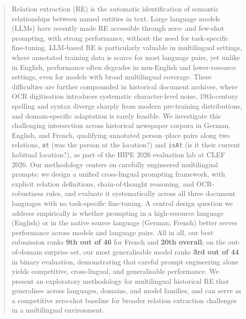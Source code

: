 \documentclass[
]{ceurart}
\theoremstyle{definition}
\begin{document}
\begin{abstract}
Relation extraction (RE) is the automatic identification of semantic relationships between named entities in text. Large language models (LLMs) have recently made RE accessible through zero- and few-shot prompting, with strong performance, without the need for task-specific fine-tuning.
LLM-based RE is particularly valuable in multilingual settings, where annotated training data is scarce for most language pairs, yet unlike in English, performance often degrades in non-English and lower-resource settings, even for models with broad multilingual coverage.
These difficulties are further compounded in historical document archives, where OCR digitisation introduces systematic character-level noise, 19th-century spelling and syntax diverge sharply from modern pre-training distributions, and domain-specific adaptation is rarely feasible.
We investigate this challenging intersection across historical newspaper corpora in German, English, and French, qualifying annotated person--place pairs along two relations, \texttt{at} (was the person at the location?) and \texttt{isAt} (is it their current habitual location?), as part of the HIPE 2026 evaluation lab at CLEF 2026.
Our methodology centers on carefully engineered multilingual prompts: we design a unified cross-lingual prompting framework, with explicit relation definitions, chain-of-thought reasoning, and OCR-robustness rules, and evaluate it systematically across all three document languages with no task-specific fine-tuning. A central design question we address empirically is whether prompting in a high-resource language (English) or in the native source language (German, French) better serves performance across models and language pairs.
All in all, our best submission ranks \textbf{9th out of 46} for French and \textbf{20th overall}; on the out-of-domain surprise set, our most generalisable model ranks \textbf{3rd out of 44} in binary evaluation, demonstrating that careful prompt engineering alone yields competitive, cross-lingual, and generalisable performance.
We present an exploratory methodology for multilingual historical RE that generalises across languages, domains, and model families, and can serve as a competitive zero-shot baseline for broader relation extraction challenges in a multilingual environment.
\end{abstract}
\end{document}
